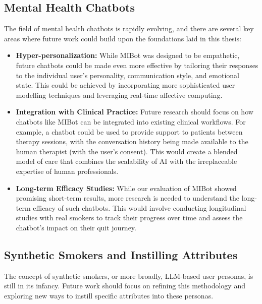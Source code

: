 \subsection{Mental Health Chatbots}

The field of mental health chatbots is rapidly evolving, and there are several key areas where future work could build upon the foundations laid in this thesis:

\begin{itemize}
    \item \textbf{Hyper-personalization:} While MIBot was designed to be empathetic, future chatbots could be made even more effective by tailoring their responses to the individual user's personality, communication style, and emotional state. This could be achieved by incorporating more sophisticated user modelling techniques and leveraging real-time affective computing.
    \item \textbf{Integration with Clinical Practice:} Future research should focus on how chatbots like MIBot can be integrated into existing clinical workflows. For example, a chatbot could be used to provide support to patients between therapy sessions, with the conversation history being made available to the human therapist (with the user's consent). This would create a blended model of care that combines the scalability of AI with the irreplaceable expertise of human professionals.
    \item \textbf{Long-term Efficacy Studies:} While our evaluation of MIBot showed promising short-term results, more research is needed to understand the long-term efficacy of such chatbots. This would involve conducting longitudinal studies with real smokers to track their progress over time and assess the chatbot's impact on their quit journey.
\end{itemize}

\subsection{Synthetic Smokers and Instilling Attributes}

The concept of synthetic smokers, or more broadly, LLM-based user personas, is still in its infancy. Future work should focus on refining this methodology and exploring new ways to instill specific attributes into these personas.


